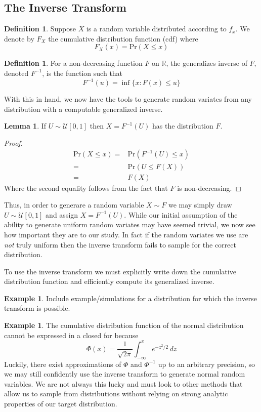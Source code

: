 \documentclass[11pt, a4paper]{article}
\theoremstyle{plain}
\theoremstyle{definition}
\newtheorem{defn}[thm]{Definition} %
\newtheorem{exmp}[thm]{Example} %
\newtheorem{lem}[thm]{Lemma}
\newcommand{\R}{\mathbb{R}}
\newcommand{\pr}{\mathrm{Pr}}
\begin{document}
\subsection{The Inverse Transform}
\begin{defn} Suppose $X$ is a random variable
distributed according to $f_x$. We denote by $F_X$ the cumulative distribution function (cdf)
where $$F_X(x) = \pr(X \le x)$$
\end{defn}
\begin{defn} For a non-decreasing function $F$ on $\R$, the generalizes inverse of $F$, denoted
$F^{-1}$, is the function such that
$$F^{-1}(u) = \inf\{x : F(x) \le u\}$$
\end{defn}
With this in hand, we now have the tools to generate
random variates from any distribution with a computable generalized inverse.
\begin{lem} If $U \sim \mathcal{U}[0, 1]$ then $X = F^{-1}(U)$ has the distribution
$F$.
\end{lem}
\begin{proof}
\begin{align*}
\pr(X \le x) ={}& \pr(F^{-1}(U) \le x)\\
={}& \pr(U \le F(X))\\
={}& F(X)
\end{align*}
Where the second equality follows from the fact that $F$ is non-decreasing. 
\end{proof}
Thus, in order to generare a random variable $X \sim F$ we may simply
draw $U \sim \mathcal{U}[0, 1]$ and assign $X = F^{-1}(U)$. While
our initial assumption of the ability to generate uniform random variates
may have seemed trivial, we now see how important they are to our study. In fact
if the random variates we use are \emph{not} truly uniform
then the inverse transform fails to sample for the correct distribution.

To use the inverse transform we must explicitly write down
the cumulative distribution function and efficiently compute
its generalized inverse. 
\begin{exmp}
Include example/simulations for a distribution for which the inverse transform
is possible.
\end{exmp}
\begin{exmp}
The cumulative distribution function of the normal distribution
cannot be expressed in a closed for because $$\Phi(x) = \dfrac{1}{\sqrt{2\pi}}\int_{-\infty}^x e^{-z^2/2}\,dz$$
Luckily, there exist approximations of $\Phi$ and $\Phi^{-1}$ up to an arbitrary 
precision, so we may still confidently use the inverse transform to generate normal 
random variables. We are not always this lucky and must look to other methods
that allow us to sample from distributions without relying on strong analytic 
properties of our target distribution. 
\end{exmp}
\end{document}
